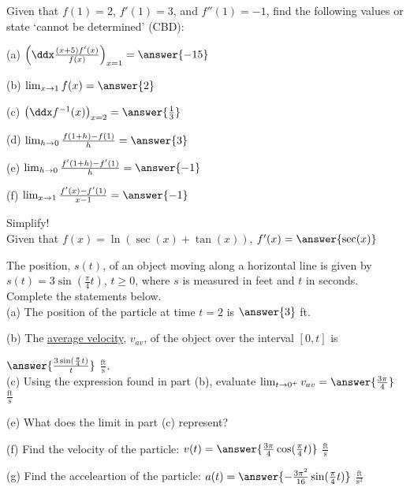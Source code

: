 \documentclass{ximera}
\begin{document}
\begin{exercise}
Given that $f(1)=2$, $f'(1)=3$, and $f''(1)=-1$, find the following values or state `cannot be determined' (CBD):

(a) $\left(\ddx\frac{(x+5)f'(x)}{f(x)}\right)_{x=1}=\answer{-15}$

(b) $\lim_{x\to 1}f(x)=\answer{2}$

(c) $\left(\ddx f^{-1}(x)\right)_{x=2}=\answer{\frac{1}{3}}$

(d) $\lim_{h\to 0}\frac{f(1+h)-f(1)}{h}=\answer{3}$

(e) $\lim_{h\to 0} \frac{f'(1+h)-f'(1)}{h}=\answer{-1}$

(f) $\lim_{x \to 1} \frac{f'(x)-f'(1)}{x-1}=\answer{-1}$

\end{exercise}

\begin{exercise}
Simplify!\\
Given that $f(x)=\ln(\sec(x)+\tan(x))$, $f'(x) = \answer{\sec(x)}$
\end{exercise}


\begin{exercise}
The position, $s(t)$, of an object moving along a horizontal line is given by $s(t)=3\sin\left(\frac{\pi}{4}t\right)$, $t\geq0$, where $s$ is measured in feet and $t$ in seconds.\\

Complete the statements below.\\

(a) The position of the particle at time $t=2$ is $\answer{3}$ ft.

(b) The \underline{average velocity}, $v_{av}$, of the object over the interval $[0,t]$ is

$\answer{\frac{3\sin(\frac{\pi}{4}t)}{t}}$ $\frac{\text{ft}}{\text{s}}$.\\

(c) Using the expression found in part (b), evaluate $\lim_{t\to0^+} v_{av} = \answer{\frac{3\pi}{4}}$ $\frac{\text{ft}}{\text{s}}$

(e) What does the limit in part (c) represent?
\begin{multipleChoice}
\end{multipleChoice}

(f) Find the velocity of the particle: $v(t)=\answer{\frac{3\pi}{4}\cos(\frac{\pi}{4}t)}$ $\frac{\text{ft}}{\text{s}}$

(g) Find the acceleartion of the particle: $a(t)=\answer{-\frac{3\pi^2}{16}\sin(\frac{\pi}{4}t)}$ $\frac{\text{ft}}{\text{s}^2}$

\end{exercise}
\end{document}
